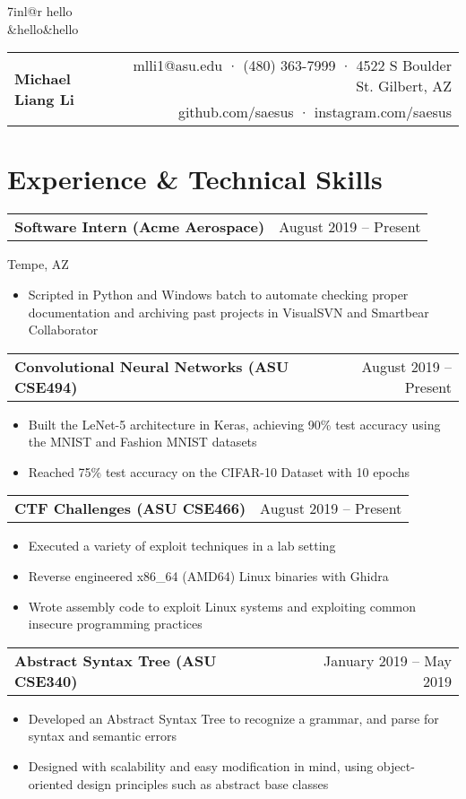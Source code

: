 \documentclass[10pt]{article}
\makeatletter
\newcommand{\headingtitle}[3]{
\begin{tabular*}{7in}{l@{\extracolsep{\fill}}r}
	\multirow{2}{*}{#1}&#2\\
	&#3\\
\end{tabular*}}
\newcommand{\subheadingt}[2]{ 	
	\begin{tabular*}{7in}{l@{\extracolsep{\fill}}r}
		\textbf{#1} & #2 \\
	\end{tabular*}}
\newcommand{\subheadingw}[3]{
	\begin{tabular*}{7in}{l@{\extracolsep{\fill}}r}
		\multirow{3}{*}#1\\
		&#2&{#3}\\
	\end{tabular*}}
\makeatother
\begin{document}
	
	\subheadingw{hello}{hello}{hello}
	
	\headingtitle{\textbf{\huge Michael Liang Li}}{mlli1@asu.edu · (480) 363-7999 · 4522 S Boulder St. Gilbert, AZ}{github.com/saesus · instagram.com/saesus}
	\vspace{-2em}
	
	\section{Experience \& Technical Skills}
		\subheadingt{Software Intern (Acme Aerospace)}{August 2019 – Present}
		Tempe, AZ\\
		\begin{itemize}[noitemsep, topsep=0pt]
			\item Scripted in Python and Windows batch to automate checking proper documentation and archiving past projects in VisualSVN and Smartbear Collaborator
		\end{itemize}
		\vspace{0.1in}
		
		\subheadingt{Convolutional Neural Networks (ASU CSE494)}{August 2019 –  Present}
		\begin{itemize}[noitemsep, topsep=0pt]
			\item Built the LeNet-5 architecture in Keras, achieving 90\% test accuracy using the MNIST and Fashion MNIST datasets 
			\item Reached 75\% test accuracy on the CIFAR-10 Dataset with 10 epochs
		\end{itemize}
		\vspace{0.1in}
		
		\subheadingt{CTF Challenges (ASU CSE466)}{August 2019 –  Present}
			\begin{itemize}[noitemsep, topsep=0pt]
				\item Executed a variety of exploit techniques in a lab setting 
				\item Reverse engineered x86\_64 (AMD64) Linux binaries with Ghidra
				\item Wrote assembly code to exploit Linux systems and exploiting common insecure programming practices
			\end{itemize}
		\vspace{0.1in}	
		
		\subheadingt{Abstract Syntax Tree (ASU CSE340)}{January 2019 – May 2019}
		\begin{itemize}[noitemsep, topsep=0pt]
			\item Developed an Abstract Syntax Tree to recognize a grammar, and parse for syntax and semantic errors
			\item Designed with scalability and easy modification in mind, using object-oriented design principles such as abstract base classes
		\end{itemize}
		\vspace{0.1in}
		
\end{document}
